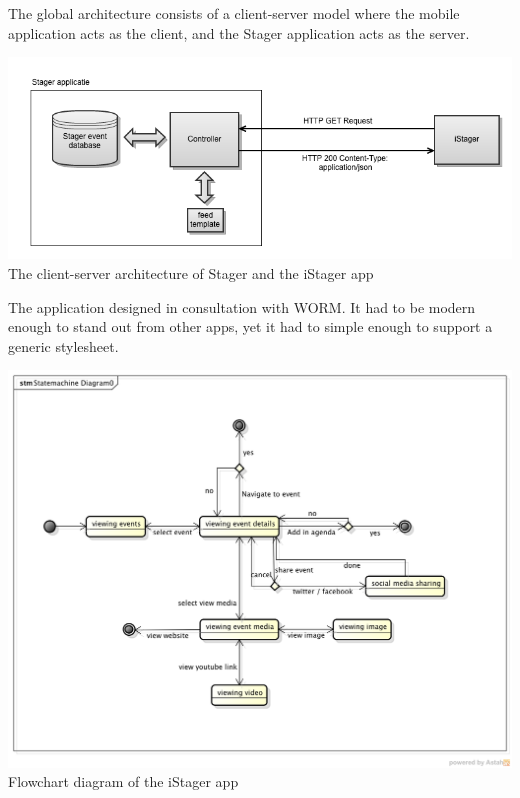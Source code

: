 The global architecture consists of a client-server model where the mobile application acts as the client, and the Stager application acts as the server.

\begin{centering}
	\includegraphics[scale=0.4]{images/globale_architectuur.png}\\{The client-server architecture of Stager and the iStager app}\\
\end{centering}

The application designed in consultation with WORM. It had to be modern enough to stand out from other apps, yet it had to simple enough to support a generic stylesheet.


\begin{centering}
	\includegraphics[scale=0.4]{images/stagerapp_statediagram.png}\\{Flowchart diagram of the iStager app}\\
\end{centering}


